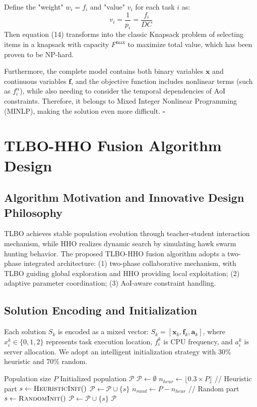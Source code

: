 \documentclass[conference]{IEEEtran}
\begin{document}
Define the "weight" $w_i = f_i$ and "value" $v_i$ for each task $i$ as:
\begin{equation}
v_i = \frac{1}{p_i} = \frac{f_i}{DC}
\end{equation}
Then equation (14) transforms into the classic Knapsack problem of selecting items in a knapsack with capacity $F^{\max}$ to maximize total value, which has been proven to be NP-hard.

Furthermore, the complete model contains both binary variables $\mathbf{x}$ and continuous variables $\mathbf{f}$, and the objective function includes nonlinear terms (such as $f_i^{\alpha}$), while also needing to consider the temporal dependencies of AoI constraints. Therefore, it belongs to Mixed Integer Nonlinear Programming (MINLP), making the solution even more difficult. $\square$

\section{TLBO-HHO Fusion Algorithm Design}
\subsection{Algorithm Motivation and Innovative Design Philosophy}
TLBO achieves stable population evolution through teacher-student interaction mechanism, while HHO realizes dynamic search by simulating hawk swarm hunting behavior. The proposed TLBO-HHO fusion algorithm adopts a two-phase integrated architecture: (1) two-phase collaborative mechanism, with TLBO guiding global exploration and HHO providing local exploitation; (2) adaptive parameter coordination; (3) AoI-aware constraint handling.

\subsection{Solution Encoding and Initialization}
Each solution $S_k$ is encoded as a mixed vector: $S_k = [\mathbf{x}_k, \mathbf{f}_k, \mathbf{a}_k]$, where $x_i^k \in \{0, 1, 2\}$ represents task execution location, $f_i^k$ is CPU frequency, and $a_i^k$ is server allocation. We adopt an intelligent initialization strategy with 30\% heuristic and 70\% random.

\begin{algorithm}[!b]
  \small
  \caption{Intelligent Initialization Strategy}
  \label{alg:init}
  \begin{algorithmic}[1]
    \REQUIRE Population size $P$
    \ENSURE Initialized population $\mathcal{P}$
    \STATE $\mathcal{P} \leftarrow \emptyset$
    \STATE $n_{heur} \leftarrow \lfloor 0.3 \times P \rfloor$ // Heuristic part
        \STATE $s \leftarrow \textsc{HeuristicInit}()$
        \STATE $\mathcal{P} \leftarrow \mathcal{P} \cup \{s\}$
    \ENDFOR
    \STATE $n_{rand} \leftarrow P - n_{heur}$ // Random part
        \STATE $s \leftarrow \textsc{RandomInit}()$
        \STATE $\mathcal{P} \leftarrow \mathcal{P} \cup \{s\}$
    \ENDFOR
    \RETURN $\mathcal{P}$
  \end{algorithmic}
\end{algorithm}
\end{document}
